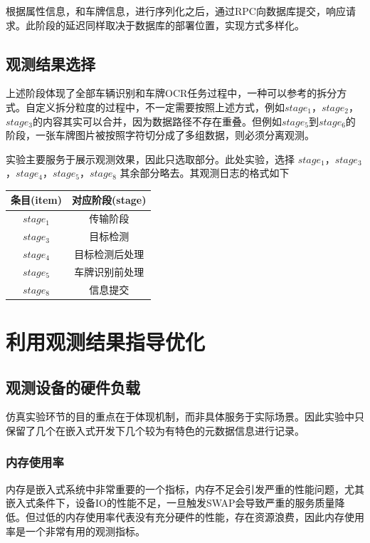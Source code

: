 \documentclass[master]{shtthesis}
\begin{document}
根据属性信息，和车牌信息，进行序列化之后，通过RPC向数据库提交，响应请求。此阶段的延迟同样取决于数据库的部署位置，实现方式多样化。

\subsection{观测结果选择}
上述阶段体现了全部车辆识别和车牌OCR任务过程中，一种可以参考的拆分方式。自定义拆分粒度的过程中，不一定需要按照上述方式，例如$stage_1$，$stage_2$，$stage_3$的内容其实可以合并，因为数据路径不存在重叠。但例如$stage_5$到$stage_6$的阶段，一张车牌图片被按照字符切分成了多组数据，则必须分离观测。

实验主要服务于展示观测效果，因此只选取部分。此处实验，选择
$stage_1$，$stage_3$，$stage_4$，$stage_5$，$stage_8$
其余部分略去。其观测日志的格式如下

\begin{table}[htbp]
	\centering
	\label{实验观测日志的格式}
	\begin{tabular}{cc}
		\toprule
		条目(item)  & 对应阶段(stage) \\
		\midrule
		$stage_1$  & 传输阶段  \\ 
		$stage_3$  & 目标检测 \\
		$stage_4$  & 目标检测后处理\\
		$stage_5$  & 车牌识别前处理 \\
		$stage_8$  & 信息提交\\
		\bottomrule
	\end{tabular}
\end{table}

\section{利用观测结果指导优化}
\subsection{观测设备的硬件负载}
仿真实验环节的目的重点在于体现机制，而非具体服务于实际场景。因此实验中只保留了几个在嵌入式开发下几个较为有特色的元数据信息进行记录。
\subsubsection{内存使用率}
内存是嵌入式系统中非常重要的一个指标，内存不足会引发严重的性能问题，尤其嵌入式条件下，设备IO的性能不足，一旦触发SWAP会导致严重的服务质量降低。但过低的内存使用率代表没有充分硬件的性能，存在资源浪费，因此内存使用率是一个非常有用的观测指标。
\end{document}
